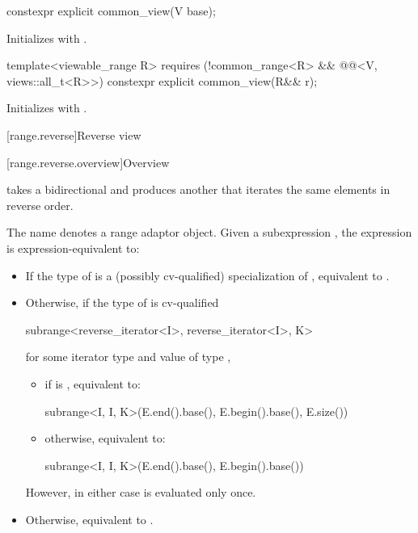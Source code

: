 %
\begin{itemdecl}
constexpr explicit common_view(V base);
\end{itemdecl}

\begin{itemdescr}
\pnum
\effects
Initializes  with .
\end{itemdescr}

%
\begin{itemdecl}
template<viewable_range R>
  requires (!common_range<R> && @@<V, views::all_t<R>>)
constexpr explicit common_view(R&& r);
\end{itemdecl}

\begin{itemdescr}
\pnum
\effects
Initializes  with .
\end{itemdescr}

[range.reverse]{Reverse view}

[range.reverse.overview]{Overview}

\pnum
{} takes a bidirectional  and produces
another  that iterates the same elements in reverse order.

\pnum
The name  denotes a
range adaptor object.
Given a subexpression , the expression
 is expression-equivalent to:
\begin{itemize}
\item
  If the type of  is
  a (possibly cv-qualified) specialization of ,
  equivalent to .
\item
  Otherwise, if the type of  is cv-qualified
\begin{codeblock}
subrange<reverse_iterator<I>, reverse_iterator<I>, K>
\end{codeblock}
  for some iterator type  and
  value  of type ,
  \begin{itemize}
  \item
    if  is , equivalent to:
\begin{codeblock}
subrange<I, I, K>(E.end().base(), E.begin().base(), E.size())
\end{codeblock}
  \item
    otherwise, equivalent to:
\begin{codeblock}
subrange<I, I, K>(E.end().base(), E.begin().base())
\end{codeblock}
  \end{itemize}
  However, in either case  is evaluated only once.
\item
  Otherwise, equivalent to .
\end{itemize}

